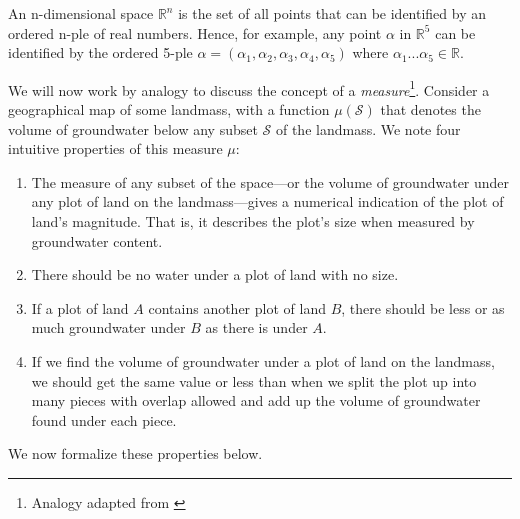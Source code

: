 \begin{mydef}
An n-dimensional space $ \mathbb{R}^{n} $ is the set of all points that can be identified by an ordered n-ple of real numbers. Hence, for example, any point $ \alpha $ in $ \mathbb{R}^{5} $ can be identified by the ordered 5-ple $ \alpha = (\alpha_{1}, \alpha_{2}, \alpha_{3}, \alpha_{4}, \alpha_{5})$ where $ \alpha_{1} ... \alpha_{5} \in \mathbb{R} $.\end{mydef}

We will now work by analogy to discuss the concept of a \textit{measure}\footnote{Analogy adapted from \citep{mandelbrotmultifractal}}. Consider a geographical map of some landmass, with a function $ \mu(\mathcal{S}) $ that denotes the volume of groundwater below any subset $ \mathcal{S} $ of the landmass. We note four intuitive properties of this measure $ \mu $:\begin{enumerate}
\item The measure of any subset of the space---or the volume of groundwater under any plot of land on the landmass---gives a numerical indication of the plot of land's magnitude. That is, it describes the plot's size when measured by groundwater content.
\item\label{measureofanullset} There should be no water under a plot of land with no size. 
\item\label{measureofsubsets} If a plot of land $ A $ contains another plot of land $ B $, there should be less or as much groundwater under $B$ as there is under $A$. 
\item\label{measureaddition} If we find the volume of groundwater under a plot of land on the landmass, we should get the same value or less than when we split the plot up into many pieces with overlap allowed and add up the volume of groundwater found under each piece. 
\end{enumerate}
We now formalize these properties below.

